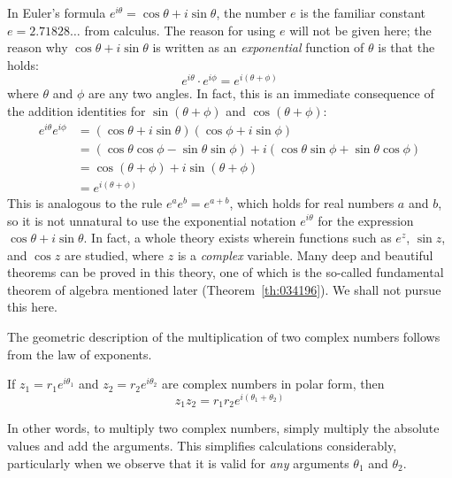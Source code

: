 \documentclass{ximera}
\begin{document}
In Euler's formula $e^{i\theta}= \cos \theta + i \sin \theta$, the number $e$ is the familiar constant $e = 2.71828\dots$  from calculus. The reason for using $e$ will not be given here; the reason why $\cos \theta + i \sin \theta$ is written as an \textit{exponential} function of $\theta$ is that the  holds:
\begin{equation*}
e^{i\theta} \cdot e^{i\phi} = e^{i (\theta + \phi)}
\end{equation*}
where $\theta$ and $\phi$ are any two angles. In fact, this is an immediate consequence of the addition identities for $\sin(\theta + \phi)$ and $\cos(\theta + \phi)$:
\newpage
\begin{align*}
e^{i\theta} e^{i\phi} &= (\cos \theta + i \sin \theta) (\cos \phi + i \sin \phi) \\
&= (\cos \theta \cos \phi - \sin \theta \sin \phi) + i (\cos \theta \sin \phi + \sin \theta \cos \phi) \\
&= \cos (\theta +  \phi) +i \sin (\theta + \phi) \\
& =e^{i (\theta + \phi)}
\end{align*}
This is analogous to the rule $e^{a}e^{b} = e^{a+b}$, which holds for real numbers $a$ and $b$, so it is not unnatural to use the exponential notation $e^{i\theta}$ for the expression $\cos \theta + i \sin \theta$. In fact, a whole theory exists wherein functions such as $e^{z}$, $\sin z$, and $\cos z$ are studied, where $z$ is a \textit{complex}
 variable. Many deep and beautiful theorems can be proved in this
theory, one of which is the so-called fundamental theorem of algebra
mentioned later (Theorem~\ref{th:034196}). We shall not pursue this here.

The geometric description of the multiplication of two complex numbers follows from the law of exponents.

\begin{theorem}\label{th:034029}
If $z_{1} = r_{1}e^{i{\theta}_1}$ and $z_{2} = r_{2}e^{i{\theta}_2}$ are complex numbers in polar form, then
\begin{equation*}
z_1z_2 = r_1r_2e^{i (\theta_1 + \theta_2)}
\end{equation*}
\end{theorem}

In other words, to multiply two complex
 numbers, simply multiply the absolute values and add the arguments.
This simplifies calculations considerably, particularly when we observe
that it is valid for \textit{any} arguments $\theta_{1}$ and $\theta_{2}$.
\end{document}
